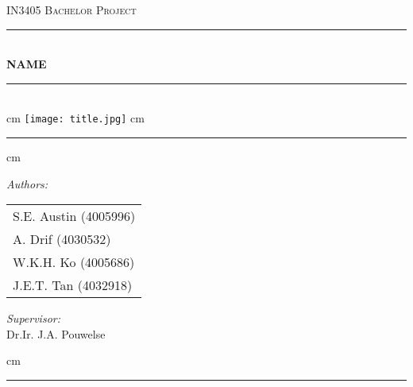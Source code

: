 \documentclass[a4paper]{report}
\begin{document}
\begin{titlepage}
			\begin{center}
			\textsc{\LARGE {IN3405 Bachelor Project}}\\[1cm]
			\rule{\linewidth}{0.5mm} \\[0.4cm]

			{\Huge \bfseries NAME}\\[0.15cm]

			\rule{\linewidth}{0.5mm} \\[1.5cm]
			
			 cm
			\texttt{[image: title.jpg]}
			 cm
				\rule{\linewidth}{0.5mm}
			
			 cm
			
			\begin{minipage}{0.4\textwidth}
				\begin{flushleft} \large
					\emph{Authors:}\\
					\begin{tabular}{l}
						S.E. Austin (4005996) \\
						A. Drif (4030532) \\
						W.K.H. Ko (4005686) \\
						J.E.T. Tan (4032918)
					\end{tabular}
				\end{flushleft}
			\end{minipage}
			\hspace{1cm}
			\begin{minipage}{0.4\textwidth}
				\begin{flushright} \large
					\emph{Supervisor:} \\
					Dr.Ir. J.A. Pouwelse
				\end{flushright}
			\end{minipage}
			
			 cm
			
			\rule{\linewidth}{0.5mm}
			\end{center}
\end{titlepage}



\tableofcontents











\end{document}
